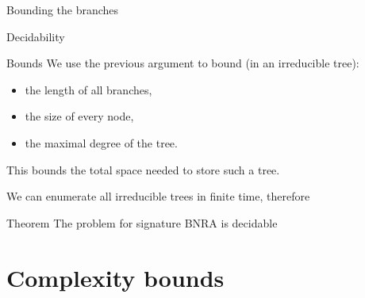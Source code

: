 \documentclass{beamer}
\begin{document}
\begin{frame}{Bounding the branches}
	\centering
	

\end{frame}


\begin{frame}{Decidability}
	\begin{block}{Bounds}
	We use the previous argument to bound (in an irreducible tree):
	\begin{itemize}
	\item the length of all branches,
	\item the size of every node,
	\item the maximal degree of the tree.
	\end{itemize}
	This bounds the total space needed to store such a tree.
	\end{block}
	\pause 

	We can enumerate all irreducible trees in finite time, therefore
	
	\begin{block}{Theorem}
		The {} problem for \color{blue}signature \color{black} BNRA is decidable \onslide<3->{\color{red!70!black} and in $\mathbf{F}_{\omega^\omega}$.}
	\end{block} 
\end{frame}

\section{Complexity bounds}



	
	
	
	
	
\end{document}
